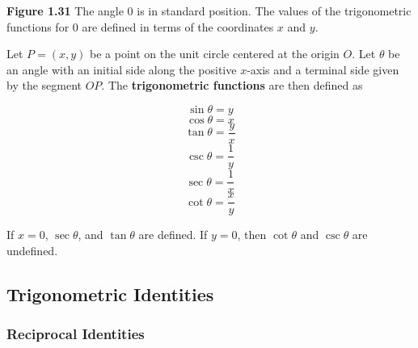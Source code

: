 
	\textbf{Figure 1.31} The angle \(0\) is in standard position. The values of the trigonometric functions for \(0\) are defined in terms of the coordinates \(x\) and \(y\).

	\newpage 
Let \(P=(x,y)\) be a point on the unit circle centered at the origin \(O\). Let \(\theta\) be an angle with an initial side along the positive \(x\)-axis and a terminal side given by the segment \(OP\). The \textbf{trigonometric functions} are then defined as 

\[\sin\theta=y\]
\[\cos\theta=x\]
\[\tan\theta=\frac{y}{x}\]
\[\csc\theta=\frac{1}{y}\]
\[\sec\theta=\frac{1}{x}\]
\[\cot\theta=\frac{x}{y}\]

If \(x=0\), \(\sec\theta\), and \(\tan\theta\) are defined. If \(y=0\), then \(\cot\theta\) and \(\csc \theta\) are undefined. 

\subsection{Trigonometric Identities} 
\subsubsection{Reciprocal Identities}

